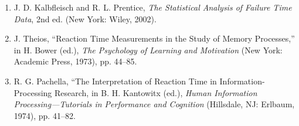 \documentclass[
]{report}
\begin{document}
\begin{enumerate}
\item J. D. Kalbfleisch and R. L. Prentice, \textit{The Statistical Analysis of Failure Time Data}, 2nd ed. (New York: Wiley, 2002).
\item J. Theios, “Reaction Time Measurements in the Study of Memory Processes,” in H. Bower (ed.), \textit{The Psychology of Learning and Motivation} (New York: Academic Press, 1973), pp. 44–85.
\item R. G. Pachella, “The Interpretation of Reaction Time in Information-Processing Research, in B. H. Kantowitx (ed.), \textit{Human Information Processing—Tutorials in Performance and Cognition} (Hillsdale, NJ: Erlbaum, 1974), pp. 41–82.

\end{enumerate}

  
\end{document}
